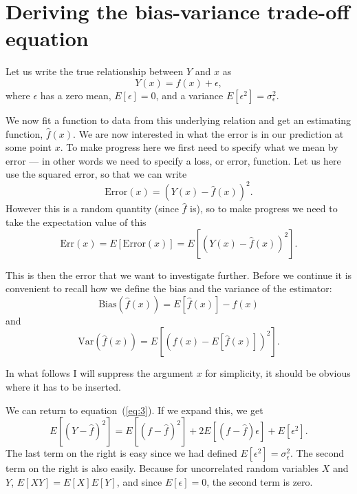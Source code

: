 \documentclass[12pt]{article}
\begin{document}
\section{Deriving the bias-variance trade-off equation}
\label{sec:deriv-bias-vari}

Let us write the true relationship between $Y$ and $x$ as
\begin{equation}
  \label{eq:1}
  Y(x) = f(x) + \epsilon,
\end{equation}
where $\epsilon$ has a zero mean, $E[\epsilon] = 0$, and a variance $E[\epsilon^2]=\sigma_\epsilon^2$. 

We now fit a function to data from this underlying relation and get an estimating function, $\hat{f}(x)$. We are now interested in what the error is in our prediction at some point $x$. To make progress here we first need to specify what we mean by error --- in other words we need to specify a loss, or error, function. Let us here use the squared error, so that we can write
\begin{equation}
  \label{eq:2}
  \mathrm{Error}(x) = \left(Y(x)-\hat{f}(x)\right)^2.
\end{equation}
However this is a random quantity (since $\hat{f}$ is), so to make progress we need to take the expectation value of this 
\begin{equation}
  \label{eq:3}
  \mathrm{Err}(x) = E\left[\mathrm{Error}(x)\right] = E\left[(Y(x)-\hat{f}(x))^2\right]. 
\end{equation}

This is then the error that we want to investigate further. Before we continue it is convenient to recall how we define the bias and the variance of the estimator:
\begin{equation}
  \label{eq:4}
  \mathrm{Bias}\left(\hat{f}(x)\right) = E\left[\hat{f}(x)\right]-f(x)
\end{equation}
and 
\begin{equation}
  \label{eq:5}
  \mathrm{Var}\left(\hat{f}(x)\right) = E\left[ \left(f(x) - E\left[\hat{f}(x)\right]\right)^2 \right].
\end{equation}

In what follows I will suppress the argument $x$ for simplicity, it should be obvious where it has to be inserted. 

We can return to equation~(\ref{eq:3}). If we expand this, we get
\begin{equation}
  \label{eq:6}
  E\left[(Y-\hat{f})^2\right] = E\left[(f-\hat{f})^2\right] + 2 E\left[(f-\hat{f})\epsilon\right] + E\left[\epsilon^2\right].
\end{equation}
The last term on the right is easy since we had defined $E[\epsilon^2]=\sigma_\epsilon^2$. The second term on the right is also easily. Because for uncorrelated random variables $X$ and $Y$, $E[X Y]=E[X] E[Y]$, and since $E[\epsilon]=0$, the second term is zero.
\end{document}
